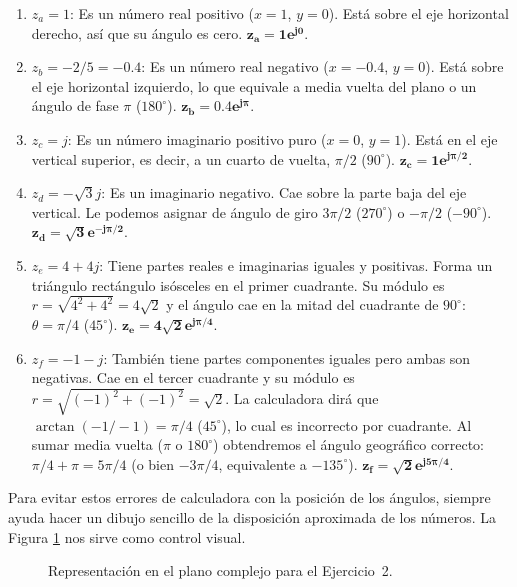 \documentclass[10pt,a4paper]{article}
\begin{document}
	\begin{enumerate}[label=\textbf{\alph*)}]
		\item \textbf{$z_a = 1$}: Es un número real positivo ($x=1$, $y=0$). Está sobre el eje horizontal derecho, así que su ángulo es cero. \quad $\mathbf{z_a = 1 e^{j0}}$.
		\item \textbf{$z_b = -2/5 = -0.4$}: Es un número real negativo ($x=-0.4$, $y=0$). Está sobre el eje horizontal izquierdo, lo que equivale a media vuelta del plano o un ángulo de fase $\pi$ ($180^\circ$). \quad $\mathbf{z_b = 0.4 e^{j\pi}}$.
		\item \textbf{$z_c = j$}: Es un número imaginario positivo puro ($x=0$, $y=1$). Está en el eje vertical superior, es decir, a un cuarto de vuelta, $\pi/2$ ($90^\circ$). \quad $\mathbf{z_c = 1 e^{j\pi/2}}$.
		\item \textbf{$z_d = -\sqrt{3}j$}: Es un imaginario negativo. Cae sobre la parte baja del eje vertical. Le podemos asignar de ángulo de giro $3\pi/2$ ($270^\circ$) o $-\pi/2$ ($-90^\circ$). \quad $\mathbf{z_d = \sqrt{3} e^{-j\pi/2}}$.
		\item \textbf{$z_e = 4+4j$}: Tiene partes reales e imaginarias iguales y positivas. Forma un triángulo rectángulo isósceles en el primer cuadrante. Su módulo es $r = \sqrt{4^2+4^2} = 4\sqrt{2}$ y el ángulo cae en la mitad del cuadrante de $90^\circ$: $\theta = \pi/4$ ($45^\circ$). \quad $\mathbf{z_e = 4\sqrt{2} e^{j\pi/4}}$.
		\item \textbf{$z_f = -1-j$}: También tiene partes componentes iguales pero ambas son negativas. Cae en el tercer cuadrante y su módulo es $r = \sqrt{(-1)^2+(-1)^2} = \sqrt{2}$. La calculadora dirá que $\arctan(-1/-1) = \pi/4$ ($45^\circ$), lo cual es incorrecto por cuadrante. Al sumar media vuelta ($\pi$ o $180^\circ$) obtendremos el ángulo geográfico correcto: $\pi/4 + \pi = 5\pi/4$ (o bien $-3\pi/4$, equivalente a $-135^\circ$). \quad $\mathbf{z_f = \sqrt{2} e^{j5\pi/4}}$.
	\end{enumerate}
	
	Para evitar estos errores de calculadora con la posición de los ángulos, siempre ayuda hacer un dibujo sencillo de la disposición aproximada de los números. La Figura \ref{fig:ejer2} nos sirve como control visual.
	
	\begin{figure}[H]
		\centering
		
		\caption{Representación en el plano complejo para el Ejercicio~2.}
		\label{fig:ejer2}
	\end{figure}
	
\end{document}
